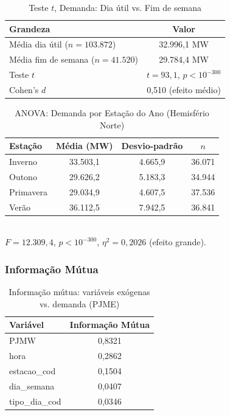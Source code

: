 \documentclass[12pt,a4paper]{article}
\begin{document}
\begin{table}[H]
\centering
\caption{Teste $t$, Demanda: Dia útil vs. Fim de semana}
\begin{tabular}{lc}
\toprule
Grandeza & Valor \\
\midrule
Média dia útil ($n=103.872$)     & 32.996,1 MW \\
Média fim de semana ($n=41.520$) & 29.784,4 MW \\
Teste $t$                        & $t=93{,}1$, $p<10^{-300}$ \\
Cohen's $d$                      & 0{,}510 (efeito médio) \\
\bottomrule
\end{tabular}
\end{table}

\begin{table}[H]
\centering
\caption{ANOVA: Demanda por Estação do Ano (Hemisfério Norte)}
\begin{tabular}{lccc}
\toprule
Estação & Média (MW) & Desvio-padrão & $n$ \\
\midrule
Inverno    & 33.503,1 & 4.665,9 & 36.071 \\
Outono     & 29.626,2 & 5.183,3 & 34.944 \\
Primavera  & 29.034,9 & 4.607,5 & 37.536 \\
Verão      & 36.112,5 & 7.942,5 & 36.841 \\
\bottomrule
\end{tabular}
\\[0.2cm]
\footnotesize{$F=12.309{,}4$, $p<10^{-300}$, $\eta^2=0{,}2026$ (efeito grande).}
\end{table}

\subsubsection*{Informação Mútua}

\begin{table}[H]
\centering
\caption{Informação mútua: variáveis exógenas vs. demanda (PJME)}
\begin{tabular}{lc}
\toprule
Variável & Informação Mútua \\
\midrule
PJMW           & 0{,}8321 \\
hora           & 0{,}2862 \\
estacao\_cod   & 0{,}1504 \\
dia\_semana    & 0{,}0407 \\
tipo\_dia\_cod & 0{,}0346 \\
\bottomrule
\end{tabular}
\end{table}
\end{document}
